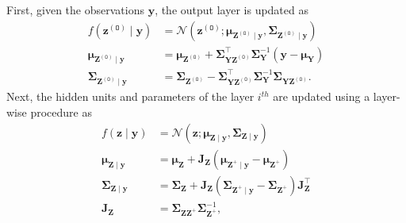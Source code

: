 \documentclass{article}
\begin{document}
%
First, given the observations $\bm{y}$, the output layer is updated as
\begin{equation*} \label{eq:z0update}
\begin{aligned}
f\left(\boldsymbol{z}^{(\mathtt{O})} \mid \boldsymbol{y}\right) &=\mathcal{N}\left(\boldsymbol{z}^{(\mathtt{O})} ; \boldsymbol{\mu}_{\boldsymbol{Z}^{(\mathtt{O})} \mid \boldsymbol{y}}, \boldsymbol{\Sigma}_{\boldsymbol{Z}^{(\mathtt{O})} \mid \boldsymbol{y}}\right) \\
\boldsymbol{\mu}_{\boldsymbol{Z}^{(\mathtt{O})} \mid \boldsymbol{y}} &=\boldsymbol{\mu}_{\boldsymbol{Z}^{(\mathtt{O})}}+\boldsymbol{\Sigma}_{\boldsymbol{Y} \boldsymbol{Z}^{(\mathtt{O})}}^{\top} \boldsymbol{\Sigma}_{\boldsymbol{Y}}^{-1}\left(\boldsymbol{y}-\boldsymbol{\mu}_{\boldsymbol{Y}}\right) \\
\boldsymbol{\Sigma}_{\boldsymbol{Z}^{(\mathtt{O})} \mid \boldsymbol{y}} &=\boldsymbol{\Sigma}_{\boldsymbol{Z}^{(\mathtt{O})}}-\boldsymbol{\Sigma}_{\boldsymbol{Y} \boldsymbol{Z}^{(\mathtt{O})}}^{\top} \boldsymbol{\Sigma}_{\boldsymbol{Y}}^{-1} \boldsymbol{\Sigma}_{\boldsymbol{Y Z}^{(\mathtt{O})}}.
\end{aligned}
\end{equation*}
%
Next, the hidden units and parameters of the layer $i^{th}$ are updated using a layer-wise procedure as
\begin{equation*}  \label{eq:layerwiseupdate}
\begin{aligned}
f(\boldsymbol{z} \mid \boldsymbol{y}) &=\mathcal{N}\left(\boldsymbol{z} ; \boldsymbol{\mu}_{\boldsymbol{Z} \mid \boldsymbol{y}}, \boldsymbol{\Sigma}_{\boldsymbol{Z} \mid \boldsymbol{y}}\right) \\
\boldsymbol{\mu}_{\boldsymbol{Z} \mid \boldsymbol{y}} &=\boldsymbol{\mu}_{\boldsymbol{Z}}+\mathbf{J}_{\boldsymbol{Z}}\left(\boldsymbol{\mu}_{\boldsymbol{Z}^{+} \mid \boldsymbol{y}}-\boldsymbol{\mu}_{\boldsymbol{Z}^{+}}\right) \\
\boldsymbol{\Sigma}_{\boldsymbol{Z} \mid \boldsymbol{y}} &=\boldsymbol{\Sigma}_{\boldsymbol{Z}}+\mathbf{J}_{\boldsymbol{Z}}\left(\boldsymbol{\Sigma}_{\boldsymbol{Z}^{+} \mid \boldsymbol{y}}-\boldsymbol{\Sigma}_{\boldsymbol{Z}^{+}}\right) \mathbf{J}_{\boldsymbol{Z}}^{\top} \\
\mathbf{J}_{\boldsymbol{Z}} &=\boldsymbol{\Sigma}_{\boldsymbol{Z Z}^{+}} \boldsymbol{\Sigma}_{\boldsymbol{Z}^{+}}^{-1},
\end{aligned}
\end{equation*}
%
\end{document}

